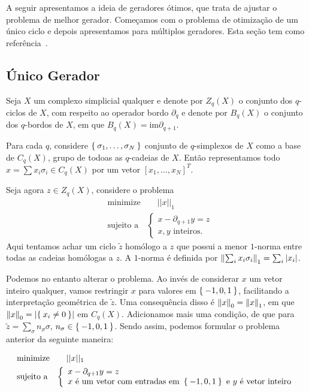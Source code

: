 A seguir apresentamos a ideia de geradores ótimos, que trata de ajustar
o problema de melhor gerador. Começamos com o problema de otimização
de um único ciclo e depois apresentamos para múltiplos geradores. 
Esta seção tem como referência~\cite{Escolar2015}. 

\subsection{Único Gerador}
Seja $X$ um complexo simplicial qualquer e denote por $Z_q(X)$ o 
conjunto dos $q$-ciclos de $X$, com respeito ao operador bordo $\partial_q$ e 
denote por $B_q(X)$ o conjunto dos $q$-bordos de $X$, em que 
$B_q(X) = \text{im} \partial_{q+1}$.

Para cada $q$, considere $\Set{\sigma_1, \dots, \sigma_N}$ conjunto de $q$-simplexos
de $X$ como a base de $C_q(X)$, grupo de todoas as $q$-cadeias de $X$. Então
representamos todo $x = \sum x_i\sigma_i \in C_q(X)$ por um vetor 
$[x_1, \dots, x_N]^T$. 

Seja agora $z \in Z_q(X)$, considere o problema 
\begin{equation}\label{eq:probfour}
    \begin{split}
        &\text{minimize} \quad \quad ||x||_1 \\
        &\text{sujeito a} \quad \left \{ \begin{array}{l}
            x - \partial_{q+1} y = z \\
            x,y \text{ inteiros.}
        \end{array} \right.
    \end{split}
\end{equation}
Aqui tentamos achar um ciclo $\tilde{z}$ homólogo a $z$ que possui 
a menor $1$-norma entre todas as cadeias homólogas a $z$. A $1$-norma é definida
por $\left\lVert\sum_i x_i\sigma_i\right\rVert_1 = \sum_i\left\lvert x_i\right\rvert$. 

Podemos no entanto alterar o problema. Ao invés de considerar $x$ um vetor inteiro
qualquer, vamos restringir $x$ para valores em $\Set{-1,0,1}$, facilitando a interpretação
geométrica de $\tilde{z}$. Uma consequência disso é $\left\lVert x\right\rVert_0 = \left\lVert x\right\rVert_1$, em que
$\left\lVert x\right\rVert_0 = \left\lvert\Set{x_i \neq 0}\right\rvert$ em $C_q(X)$. Adicionamos mais uma condição,
de que para $\tilde{z} = \sum_\sigma n_\sigma \sigma$, $n_\sigma \in \Set{-1,0,1}$. 
Sendo assim, podemos formular o problema anterior da seguinte maneira:

\begin{equation}\label{eq:probfive}
    \begin{split}
        &\text{minimize} \quad \quad ||x||_1 \\
        &\text{sujeito a} \quad \left \{ \begin{array}{l}
            x - \partial_{q+1} y = z \\
            x \text{ é um vetor com entradas em } \Set{-1,0,1} \text{ e } 
            y \text{ é vetor inteiro}
        \end{array} \right.
    \end{split}
\end{equation}

